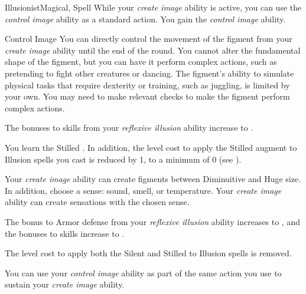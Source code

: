 \begin{feat}{Illusionist}{Magical, Spell}
         While your \textit{create image} ability is active, you can use the \textit{control image} ability as a standard action.
        You gain the \textit{control image} ability.
        \begin{ability}{Control Image}{}
            You can directly control the movement of the figment from your \textit{create image} ability until the end of the round.
            You cannot alter the fundamental shape of the figment, but you can have it perform complex actions, such as pretending to fight other creatures or dancing.
            The figment's ability to simulate physical tasks that require dexterity or training, such as juggling, is limited by your own.
            You may need to make relevant checks to make the figment perform complex actions.
        \end{ability}

         The bonuses to skills from your \textit{reflexive illusion} ability increase to .

         You learn the Stilled .
        In addition, the level cost to apply the Stilled augment to Illusion spells you cast is reduced by 1, to a minimum of 0 (see ).

         Your \textit{create image} ability can create figments between Diminuitive and Huge size.
        In addition, choose a sense: sound, smell, or temperature.
        Your \textit{create image} ability can create sensations with the chosen sense.

         The bonus to Armor defense from your \textit{reflexive illusion} ability increases to , and the bonuses to skills increase to .

         The level cost to apply both the Silent and Stilled  to Illusion spells is removed.

         You can use your \textit{control image} ability as part of the same action you use to sustain your \textit{create image} ability. 
    \end{feat}

